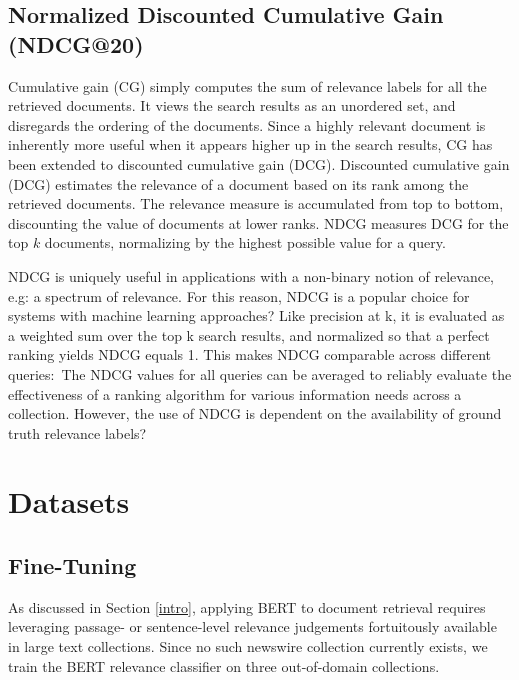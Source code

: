 \subsection{Normalized Discounted Cumulative Gain (NDCG@20)}

Cumulative gain (CG) simply computes the sum of relevance labels for all the retrieved documents.
It views the search results as an unordered set, and disregards the ordering of the documents.
Since a highly relevant document is inherently more useful when it appears higher up in the search results, CG has been extended to discounted cumulative gain (DCG).
Discounted cumulative gain (DCG) estimates the relevance of a document based on its rank among the retrieved documents.
The relevance measure is accumulated from top to bottom, discounting the value of documents at lower ranks.
NDCG measures DCG for the top $ k $ documents, normalizing by the highest possible value for a query.

NDCG is uniquely useful in applications with a non-binary notion of relevance, e.g: a spectrum of relevance. 
For this reason, NDCG is a popular choice for systems with machine learning approaches?
Like precision at k, it is evaluated as a weighted sum over the top k search results, and normalized so that a perfect ranking yields NDCG equals 1.
This makes NDCG comparable across different queries:\
The NDCG values for all queries can be averaged to reliably evaluate the effectiveness of a ranking algorithm for various information needs across a collection.
However, the use of NDCG is dependent on the availability of ground truth relevance labels?

\section{Datasets}



\subsection{Fine-Tuning}

As discussed in Section \ref{intro}, applying BERT to document retrieval requires leveraging passage- or sentence-level relevance judgements fortuitously available in large text collections.
Since no such newswire collection currently exists, we train the BERT relevance classifier on three out-of-domain collections.

